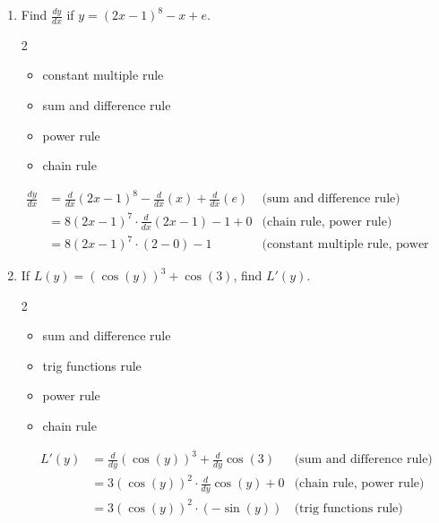 \documentclass[letter, 12pt]{article}
\newenvironment{red}{ %
\color{red}}{\ignorespacesafterend
} %
\newcommand{\diff}[1]{\frac{d}{d#1}}
\begin{document}
\begin{enumerate}[{\bf (1)}]
\item
Find $\frac{dy}{dx}$ if \(y=(2x-1)^8-x+e\).

\begin{red}
	\begin{multicols}{2}
		\begin{itemize}
			\item constant multiple rule
			\item sum and difference rule
			\item power rule
			\item chain rule
		\end{itemize}
	\end{multicols}
	
	\begin{align*}
	\frac{dy}{dx} &= \diff{x}(2x-1)^8 - \diff{x}(x) + \diff{x}(e)
	& \textrm{(sum and difference rule)} \\
	&= 8(2x-1)^7\cdot\diff{x}(2x-1) - 1 + 0 
	& \textrm{(chain rule, power rule)} \\
	&= 8(2x-1)^7 \cdot (2 - 0) - 1 
	& \textrm{(constant multiple rule, power rule)}
	\end{align*}
\end{red}
 
\item 
If \(L(y) = (\cos(y))^{3} + \cos(3)\), find $L'(y)$.

\begin{red}
	\begin{multicols}{2}
		\begin{itemize}
			\item sum and difference rule
			\item trig functions rule
			\item power rule
			\item chain rule
		\end{itemize}
	\end{multicols}
	
	\begin{align*}
	L'(y) &= \diff{y}(\cos(y))^3 + \diff{y}\cos(3)
	& \textrm{(sum and difference rule)} \\
	&= 3(\cos(y))^2\cdot\diff{y}\cos(y) + 0
	& \textrm{(chain rule, power rule)} \\
	&= 3(\cos(y))^2\cdot(-\sin(y))
	& \textrm{(trig functions rule)}
	\end{align*}
\end{red}
 
\pagebreak


\end{enumerate}
\end{document}
